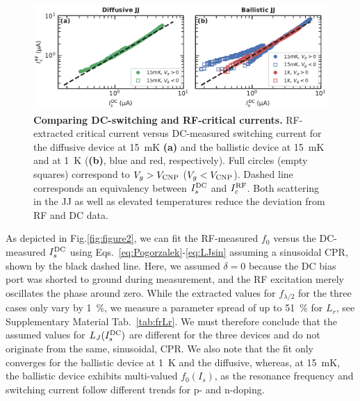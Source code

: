 \begin{figure}[t]
	\centering
	\includegraphics[width=\linewidth]{chapter-gJJ-CPR/figs/Figure3}
	\caption{
		\textbf{Comparing DC-switching and RF-critical currents.}
		RF-extracted critical current versus DC-measured switching current for the diffusive device at \SI{15}{\milli\kelvin} \textbf{(a)} and the ballistic device at \SI{15}{\milli\kelvin} and at \SI{1}{\kelvin} (\textbf{(b)}, blue and red, respectively).
		Full circles (empty squares) correspond to $V_g>V_{\rm CNP}$ ($V_g<V_{\rm CNP}$).
		Dashed line corresponds an equivalency between $I_s^{\rm DC}$ and $I_c^{\rm RF}$.
		Both scattering in the JJ as well as elevated temperatures reduce the deviation from RF and DC data.
	}
	\label{fig:figure3}
\end{figure}

As depicted in Fig.\ref{fig:figure2}, we can fit the RF-measured $f_0$ versus the DC-measured $I_s^{\rm DC}$ using Eqs.~\ref{eq:Pogorzalek}-\ref{eq:LJsin} assuming a sinusoidal CPR, shown by the black dashed line.
%
Here, we assumed $\delta=0$ because the DC bias port was shorted to ground during measurement, and the RF excitation merely oscillates the phase around zero.
%
While the extracted values for $f_{\lambda/2}$ for the three cases only vary by \SI{1}{\percent}, we measure a parameter spread of up to \SI{51}{\percent} for $L_r$, see Supplementary Material Tab.~\ref{tab:frLr}.
%
We must therefore conclude that the assumed values for $L_J(I_s^{\rm DC})$ are different for the three devices and do not originate from the same, sinusoidal, CPR.
%
We also note that the fit only converges for the ballistic device at \SI{1}{\kelvin} and the diffusive, whereas, at \SI{15}{\milli\kelvin}, the ballistic device exhibits multi-valued $f_0\left(I_s\right)$, as the resonance frequency and switching current follow different trends for p- and n-doping.

